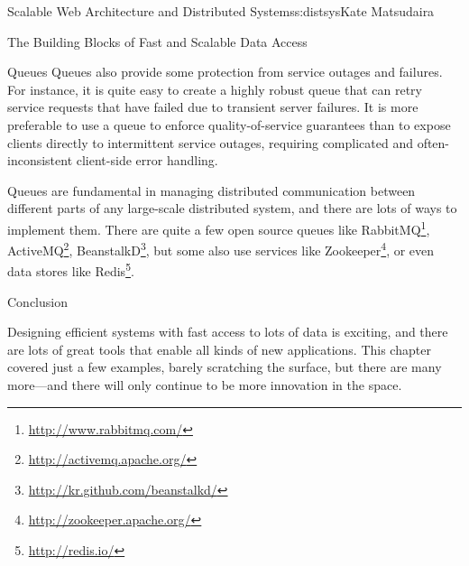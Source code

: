 \begin{aosachapter}{Scalable Web Architecture and Distributed Systems}{s:distsys}{Kate Matsudaira}
\begin{aosasect1}{The Building Blocks of Fast and Scalable Data Access}
\begin{aosasect2}{Queues}
Queues also provide some protection from service outages and
failures. For instance, it is quite easy to create a highly robust
queue that can retry service requests that have failed due to transient
server failures. It is more preferable to use a queue to enforce
quality-of-service guarantees than to expose clients directly to
intermittent service outages, requiring complicated and
often-inconsistent client-side error handling.


Queues are fundamental in managing distributed communication between
different parts of any large-scale distributed system, and there are
lots of ways to implement them. There are quite a few open source
queues like RabbitMQ\footnote{\url{http://www.rabbitmq.com/}},
ActiveMQ\footnote{\url{http://activemq.apache.org/}},
BeanstalkD\footnote{\url{http://kr.github.com/beanstalkd/}}, but some
also use services like
Zookeeper\footnote{\url{http://zookeeper.apache.org/}}, or even data
stores like Redis\footnote{\url{http://redis.io/}}.

\end{aosasect2}

\end{aosasect1}

\begin{aosasect1}{Conclusion}

Designing efficient systems with fast access to lots of data is
exciting, and there are lots of great tools that enable all kinds of
new applications. This chapter covered just a few examples, barely
scratching the surface, but there are many more---and there will only
continue to be more innovation in the space.

\end{aosasect1}

\end{aosachapter}
